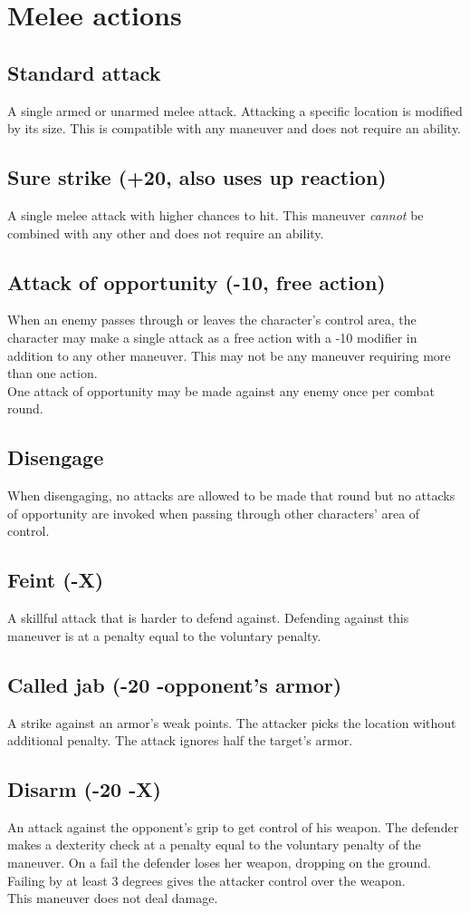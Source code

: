 \section{Melee actions}
\subsection*{Standard attack}
A single armed or unarmed melee attack. Attacking a specific location is modified by its size. This is compatible with any maneuver and does not require an ability. 
\subsection*{Sure strike (+20, also uses up reaction)}
A single melee attack with higher chances to hit. This maneuver \emph{cannot} be combined with any other and does not require an ability.
\subsection*{Attack of opportunity (-10, free action)}
When an enemy passes through or leaves the character’s control area, the character may make a single attack as a free action with a -10 modifier in addition to any other maneuver. This may not be any maneuver requiring more than one action.\\
One attack of opportunity may be made against any enemy once per combat round.
\pagebreak %
\subsection*{Disengage}
\label{action:disengage}
When disengaging, no attacks are allowed to be made that round but no attacks of opportunity are invoked when passing through other characters' area of control.
\subsection*{Feint (-X)}
A skillful attack that is harder to defend against. Defending against this maneuver is at a penalty equal to the voluntary penalty.
\subsection*{Called jab (-20 -opponent’s armor)}
A strike against an armor’s weak points. The attacker picks the location without additional penalty. The attack ignores half the target’s armor.
\subsection*{Disarm (-20 -X)}
An attack against the opponent’s grip to get control of his weapon. The defender makes a dexterity check at a penalty equal to the voluntary penalty of the maneuver. On a fail the defender loses her weapon, dropping on the ground. Failing by at least 3 degrees gives the attacker control over the weapon.\\
This maneuver does not deal damage.

